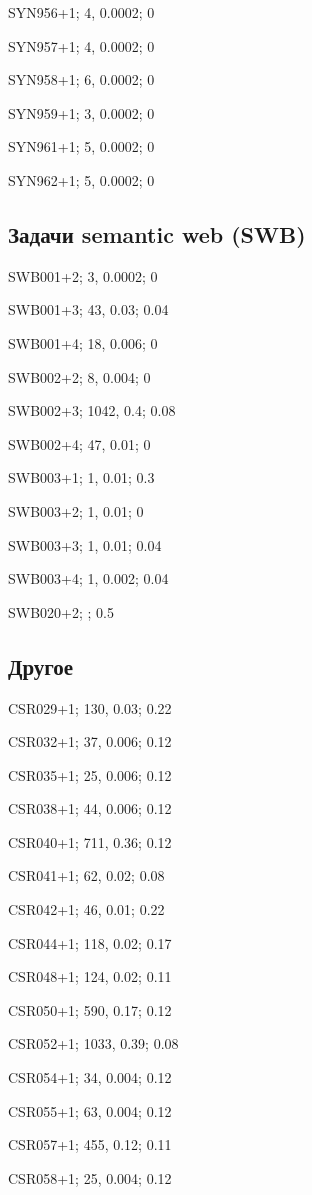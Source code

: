 SYN956+1; 4, 0.0002; 0

SYN957+1; 4, 0.0002; 0

SYN958+1; 6, 0.0002; 0

SYN959+1; 3, 0.0002; 0

SYN961+1; 5, 0.0002; 0

SYN962+1; 5, 0.0002; 0

\subsection*{Задачи semantic web (SWB)}

SWB001+2; 3, 0.0002; 0

SWB001+3; 43, 0.03; 0.04

SWB001+4; 18, 0.006; 0

SWB002+2; 8, 0.004; 0

SWB002+3; 1042, 0.4; 0.08

SWB002+4; 47, 0.01; 0

SWB003+1; 1, 0.01; 0.3

SWB003+2; 1, 0.01; 0

SWB003+3; 1, 0.01; 0.04

SWB003+4; 1, 0.002; 0.04

SWB020+2;	; 0.5


\subsection{Другое}

CSR029+1; 130, 0.03; 0.22

CSR032+1; 37, 0.006; 0.12

CSR035+1; 25, 0.006; 0.12

CSR038+1; 44, 0.006; 0.12

CSR040+1; 711, 0.36; 0.12

CSR041+1; 62, 0.02; 0.08

CSR042+1; 46, 0.01; 0.22

CSR044+1; 118, 0.02; 0.17

CSR048+1; 124, 0.02; 0.11

CSR050+1; 590, 0.17; 0.12

CSR052+1; 1033, 0.39; 0.08

CSR054+1; 34, 0.004; 0.12

CSR055+1; 63, 0.004; 0.12

CSR057+1; 455, 0.12; 0.11

CSR058+1; 25, 0.004; 0.12

